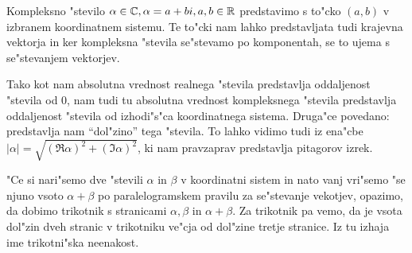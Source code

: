 Kompleksno "stevilo $\alpha \in \mathbb{C}, \alpha = a + bi, a, b \in \mathbb{R}$ predstavimo s to"cko $(a, b)$ v izbranem koordinatnem sistemu. Te to"cki nam lahko predstavljata tudi krajevna vektorja in ker kompleksna "stevila se"stevamo po komponentah, se to ujema s se"stevanjem vektorjev.

Tako kot nam absolutna vrednost realnega "stevila predstavlja oddaljenost "stevila od 0, nam tudi tu absolutna vrednost kompleksnega "stevila predstavlja oddaljenost "stevila od izhodi"s"ca koordinatnega sistema. Druga"ce povedano: predstavlja nam ``dol"zino'' tega "stevila. To lahko vidimo tudi iz ena"cbe $|\alpha| = \sqrt{(\Re\alpha)^2 + (\Im \alpha)^2}$, ki nam pravzaprav predstavlja pitagorov izrek.

"Ce si nari"semo dve "stevili $\alpha$ in $\beta$ v koordinatni sistem in nato vanj vri"semo "se njuno vsoto $\alpha + \beta$ po paralelogramskem pravilu za se"stevanje vekotjev, opazimo, da dobimo trikotnik s stranicami $\alpha, \beta$ in $\alpha + \beta$. Za trikotnik pa vemo, da je vsota dol"zin dveh stranic v trikotniku ve"cja od dol"zine tretje stranice. Iz tu izhaja ime trikotni"ska neenakost.
